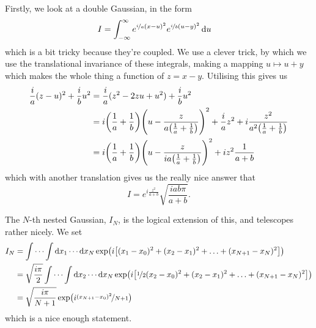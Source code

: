 Firstly, we look at a double Gaussian, in the form
\begin{align*}
  I &= \int_{-\infty}^\infty e^{\nicefrac{i}{a} {(x-u)^2}}e^{ \nicefrac{i}{b}(u-y)^2}\dd{u}
\end{align*}
which is a bit tricky because they're coupled.
We use a clever trick, by which we use the translational invariance of these integrals, making a mapping \( u \mapsto u + y \) which makes the whole thing a function of \( z = x - y \).
Utilising this gives us
\begin{align*}
  \frac{i}{a}(z-u)^2 + \frac{i}{b}u^2 &= \frac{i}{a}(z^2 - 2zu + u^2) + \frac{i}{b}u^2\\
  &= i\qty(\frac{1}{a} + \frac{1}{b})\qty(u - \frac{z}{a \qty(\frac{1}{a} + \frac{1}{b})})^2 + \frac{i}{a}z^2 + i \frac{z^2}{a^2 \qty(\frac{1}{a}  + \frac{1}{b})}\\
  &= i\qty(\frac{1}{a} + \frac{1}{b})\qty(u - \frac{z}{ia \qty(\frac{1}{a} + \frac{1}{b})})^2 + iz^2\frac{1}{a + b}
\end{align*}
which with another translation gives us the really nice answer that \[ I = e^{i\frac{z^2}{a + b}} \sqrt{\frac{iab\pi}{a+b}}.\]

The $N$-th nested Gaussian, \( I_N \), is the logical extension of this, and telescopes rather nicely.
We set
\begin{align*}
  I_N &= \idotsint \dd{x_1} \cdots \dd{x_N} \exp(i \qty[ (x_1 - x_0 )^2 + (x_2 - x_1)^2 + \ldots + (x_{N+1} - x_{N})^2])\\
      &= \sqrt{\frac{i\pi}{2}}\idotsint \dd{x_2} \cdots \dd{x_N} \exp(i \qty[ \nicefrac{1}{2}(x_2 - x_0 )^2 + (x_2 - x_1)^2 + \ldots + (x_{N+1} - x_{N})^2])\\
      &= \sqrt{\frac{i\pi}{N+1}}\exp(i \nicefrac{(x_{N+1} - x_0)^2}{N+1})
\end{align*}
which is a nice enough statement.
